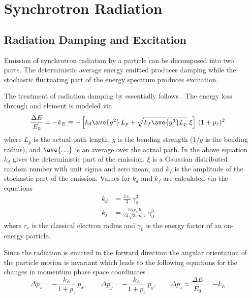 \chapter{Synchrotron Radiation}

\section{Radiation Damping and Excitation}
\label{s:radiation}

Emission of synchrotron radiation by a particle can be decomposed into two parts. The deterministic
average energy emitted produces damping while the stochastic fluctuating part of the energy spectrum
produces excitation\cite{b:jowett}.

The treatment of radiation damping by \bmad essentially follows \mad. The energy loss through and
element is modeled via
\begin{equation}
  \frac{\Delta E}{E_0} = 
  -k_E \equiv -\left[ k_d \ave{g^2} \, L_p + \sqrt{k_f \ave{g^3} L_p} \,\, \xi \right] \, (1 + p_z)^2
  \label{deekk}
\end{equation}
where $L_p$ is the actual path length, $g$ is the bending strength ($1/g$ is the bending radius),
and $\ave{\ldots}$ is an average over the actual path.  In the above equation $k_d$ gives the
deterministic part of the emission, $\xi$ is a Gaussian distributed random number with unit sigma
and zero mean, and $k_f$ is the amplitude of the stochastic part of the emission. Values for $k_d$
and $k_f$ are calculated via the equations
\begin{align}
  k_d &= \frac{2 \, r_e}{3} \, \gamma_0^3
    \label{k2r3g} \\
  k_f &= \frac{55 \, r_e \, \hbar}{24 \, \sqrt{3} \, m_e \, c} \, \gamma_0^5
    \label{k55rh}
\end{align}
where $r_e$ is the classical electron radius and $\gamma_0$ is the energy factor of an on-energy
particle.

Since the radiation is emitted in the forward direction the angular orientation of the particle
motion is invariant which leads to the following equations for the changes in momentum phase space
coordinates
\begin{equation}
  \Delta p_x = -\frac{k_E}{1 + p_z} \, p_x , \qquad
  \Delta p_y = -\frac{k_E}{1 + p_z} \, p_y, \qquad
  \Delta p_z \approx \frac{\Delta E}{E_0} = -k_E 
  \label{pk1pp}
\end{equation}

